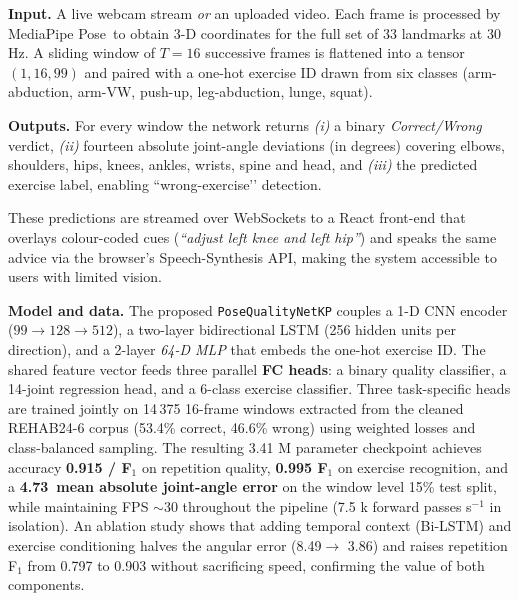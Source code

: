 \documentclass{article}
\begin{document}
\medskip
\textbf{Input.} A live webcam stream \emph{or} an uploaded video.  
Each frame is processed by MediaPipe Pose\,\cite{lugaresi2019mediapipe} to obtain 3-D
coordinates for the full set of 33 landmarks at 30 Hz.  
A sliding window of \(T=16\) successive frames is flattened into a tensor
\((1,16,99)\) and paired with a one-hot exercise ID drawn from six
classes (arm-abduction, arm-VW, push-up, leg-abduction, lunge, squat).

\medskip
\textbf{Outputs.} For every window the network returns  
\emph{(i)} a binary \emph{Correct/Wrong} verdict,  
\emph{(ii)} fourteen absolute joint-angle deviations (in degrees) covering elbows,
shoulders, hips, knees, ankles, wrists, spine and head, and  
\emph{(iii)} the predicted exercise label, enabling “wrong-exercise’’ detection.

These predictions are streamed over WebSockets to a React front-end that overlays colour-coded cues (\emph{``adjust left knee and left hip''}) and speaks the same advice via the browser’s Speech-Synthesis API, making the system accessible to users with limited vision.

\medskip
\textbf{Model and data.}  
The proposed \texttt{PoseQualityNetKP} couples a 1-D \mbox{CNN} encoder
($99\!\rightarrow\!128\!\rightarrow\!512$), a two-layer
bidirectional LSTM (256 hidden units per direction),
and a 2-layer \emph{64-D MLP} that embeds the one-hot exercise ID.
The shared feature vector feeds three parallel \textbf{FC heads}:
a binary quality classifier, a 14-joint regression head, and a
6-class exercise classifier. Three task-specific heads are trained jointly on 14\,375
16-frame windows extracted from the cleaned
\textsc{REHAB24-6} corpus (53.4\% correct, 46.6\% wrong) using
weighted losses and class-balanced sampling.
The resulting 3.41 M parameter checkpoint achieves accuracy \textbf{ 0.915 / F\(_1\)} on repetition quality,
\textbf{0.995 F\(_1\)} on exercise recognition,
and a \textbf{4.73\textdegree\ mean absolute joint-angle error}
on the window level 15\% test split,
while maintaining FPS \(\sim\!30\) throughout the pipeline (7.5 k forward passes s\(^{-1}\) in isolation).
An ablation study shows that adding temporal context (Bi-LSTM) and
exercise conditioning halves the angular error
(8.49\textdegree\;\(\rightarrow\) 3.86\textdegree)
and raises repetition F\(_1\) from 0.797 to 0.903 without
sacrificing speed, confirming the value of both components.
\end{document}

